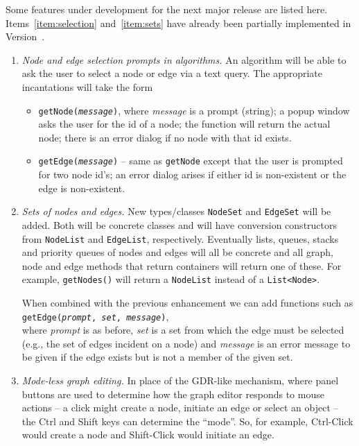 Some features under development for the next major release are listed here.
Items~\ref{item:selection} and~\ref{item:sets} have already been partially
implemented in Version~\VERSION.

\begin{enumerate}
\item \label{item:selection}
  \emph{Node and edge selection prompts in algorithms.}
  An algorithm will be able to ask the user to select a node or edge via a text query. The appropriate incantations will take the form
  \begin{itemize}
    \item \texttt{getNode(\emph{message})}, where \emph{message} is a prompt
      (string); a popup window asks the user for the id of a node; the
      function will return the actual node; there is an error dialog if
      no node with that id exists.
    \item \texttt{getEdge(\emph{message})} -- same as \texttt{getNode}
      except that the user is prompted for two node id's; an error dialog
      arises if either id is non-existent or the edge is non-existent.
  \end{itemize}

\item \label{item:sets}
  \emph{Sets of nodes and edges.}
  New types/classes \texttt{NodeSet} and \texttt{EdgeSet} will be added. Both
  will be concrete classes and will have conversion constructors from
  \texttt{NodeList} and \texttt{EdgeList}, respectively. Eventually
  lists, queues, stacks and priority queues of nodes and edges will all be
  concrete and all graph, node and edge methods that return containers will
  return one of these. For example, \texttt{getNodes()} will return a
  \texttt{NodeList} instead of a \texttt{List<Node>}.

  When combined with the previous enhancement we can add functions such as\\
  \hspace*{2em}\mbox{\texttt{getEdge(\emph{prompt}, \emph{set}, \emph{message})}},\\
  where \emph{prompt} is as before, \emph{set} is
  a set from which the edge must be selected (e.g., the set of edges incident
  on a node) and \emph{message} is an error message to be given if the
  edge exists but is not a member of the given set.

\item
  \emph{Mode-less graph editing.}
  In place of the GDR-like mechanism, where panel buttons are used to determine
  how the graph editor responds to mouse actions -- a click might create a node,
  initiate an edge or select an object --
  the \textsf{Ctrl} and \textsf{Shift} keys can determine the ``mode''.
  So, for example, \textsf{Ctrl-Click} would create a node and
  \textsf{Shift-Click} would initiate an edge.


\end{enumerate}
